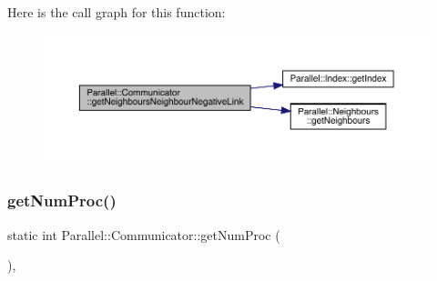 Here is the call graph for this function\+:\nopagebreak
\begin{figure}[H]
\begin{center}
\leavevmode
\includegraphics[width=350pt]{class_parallel_1_1_communicator_aebe919d44a02b37c98161ff4d3d23f6f_cgraph}
\end{center}
\end{figure}
\mbox{\label{class_parallel_1_1_communicator_a7b1f80fb49a0cc83f2031c3415174150}} 
\subsubsection{\texorpdfstring{getNumProc()}{getNumProc()}}
{\footnotesize\ttfamily static int Parallel\+::\+Communicator\+::get\+Num\+Proc (\begin{DoxyParamCaption}{ }\end{DoxyParamCaption})\hspace{0.3cm}{\ttfamily [inline]}, {\ttfamily [static]}}


